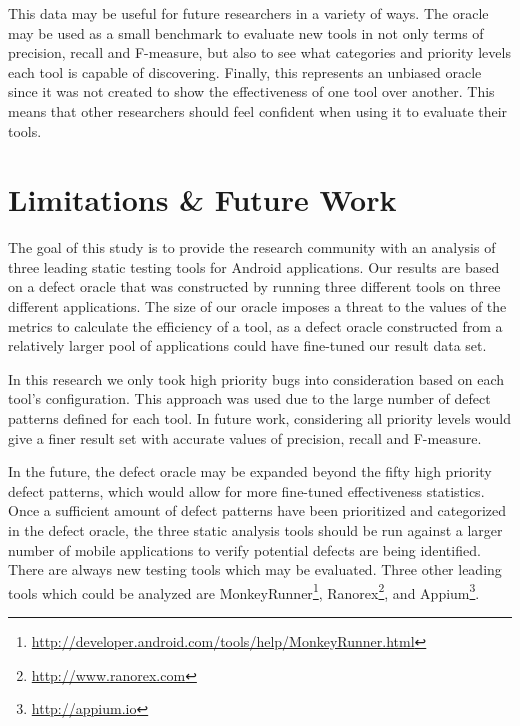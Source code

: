 \documentclass{sig-alternate}
\begin{document}
This data may be useful for future researchers in a variety of ways. The oracle may be used as a small benchmark to evaluate new tools in not only terms of precision, recall and F-measure, but also to see what categories and priority levels each tool is capable of discovering. Finally, this represents an unbiased oracle since it was not created to show the effectiveness of one tool over another. This means that other researchers should feel confident when using it to evaluate their tools.\\


\section{Limitations \& Future Work}
\label{sec:limitations}

The goal of this study is to provide the research community with an analysis of three leading static testing tools for Android applications. Our results are based on a defect oracle that was constructed by running three different tools on three different applications. The size of our oracle imposes a threat to the values of the metrics to calculate the efficiency of a tool, as a defect oracle constructed from a relatively larger pool of applications could have fine-tuned our result data set.

In this research we only took high priority bugs into consideration based on each tool's configuration. This approach was used due to the large number of defect patterns defined for each tool. In future work, considering all priority levels would give a finer result set with accurate values of precision, recall and F-measure.


In the future, the defect oracle may be expanded beyond the fifty high priority defect patterns, which would allow for more fine-tuned effectiveness statistics. Once a sufficient amount of defect patterns have been prioritized and categorized in the defect oracle, the three static analysis tools should be run against a larger number of mobile applications to verify potential defects are being identified. There are always new testing tools which may be evaluated. Three other leading tools which could be analyzed are MonkeyRunner\footnote{\url{http://developer.android.com/tools/help/MonkeyRunner.html}}, Ranorex\footnote{\url{http://www.ranorex.com}}, and Appium\footnote{\url{http://appium.io}}.
\end{document}
